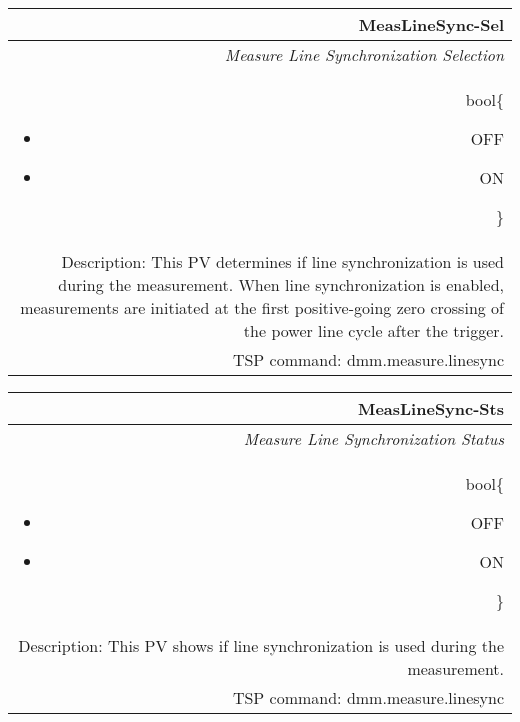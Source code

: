 \documentclass[openany]{article}
\begin{document}
		\begin{tabular}{N}
			\hline
			\bfseries MeasLineSync-Sel\label{pv:measlinesync-sel} \\ \hline
			\emph{Measure Line Synchronization Selection} \\
			bool\{\begin{itemize}[noitemsep]
				\small
				\item[] OFF
				\item[] ON
			\end{itemize}\} \\
			Description: This PV determines if line synchronization is used during the measurement. When line synchronization is enabled, measurements are initiated at the first positive-going zero crossing of the power line cycle after the trigger. \\
			TSP command: dmm.measure.linesync
		\end{tabular}

		\begin{tabular}{N}
			\hline
			\bfseries MeasLineSync-Sts\label{pv:measlinesync-sts} \\ \hline
			\emph{Measure Line Synchronization Status} \\
			bool\{\begin{itemize}[noitemsep]
				\small
				\item[] OFF
				\item[] ON
			\end{itemize}\} \\
			Description: This PV shows if line synchronization is used during the measurement. \\
			TSP command: dmm.measure.linesync
		\end{tabular}
\end{document}

